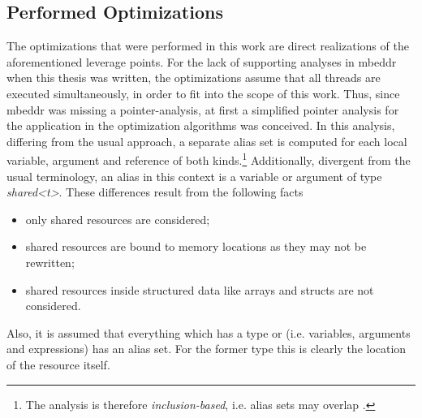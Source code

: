\subsection{Performed Optimizations}
The optimizations that were performed in this work are direct realizations of the aforementioned leverage points. For the lack of supporting analyses in mbeddr when this thesis was written, the optimizations assume that all threads are executed simultaneously, in order to fit into the scope of this work. Thus, since mbeddr was missing a pointer-analysis, at first a simplified pointer analysis for the application in the optimization algorithms was conceived. In this analysis, differing from the usual approach, a separate alias set is computed for each local variable, argument and reference of both kinds.\footnote{The analysis is therefore \textit{inclusion-based}, i.e. alias sets may overlap \cite{CloningBasedContextSensitive}.} Additionally, divergent from the usual terminology, an alias in this context is a variable or argument of type \textit{shared<t>}. These differences result from the following facts
\begin{itemize}
\item only shared resources are considered;
\item shared resources are bound to memory locations as they may not be rewritten;
\item shared resources inside structured data like arrays and structs are not considered.
\end{itemize}

Also, it is assumed that everything which has a type  or  (i.e. variables, arguments and expressions) has an alias set. For the former type this is clearly the location of the resource itself.

